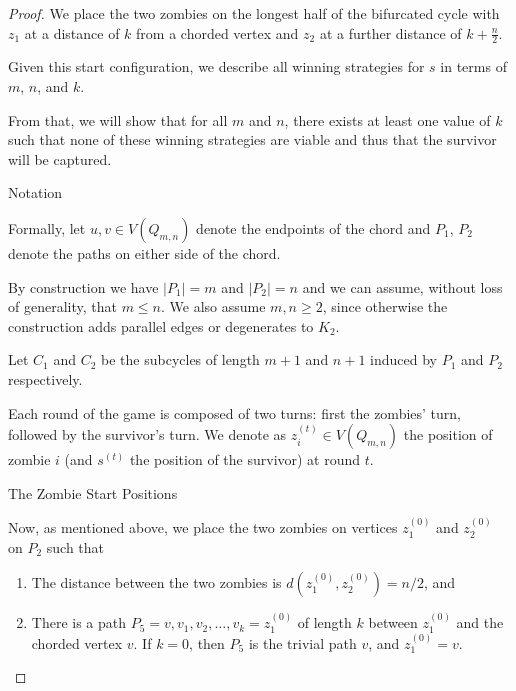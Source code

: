 \documentclass[letterpaper, 10pt]{article}
\begin{document}
\begin{proof}
We place the two zombies on the longest half of the bifurcated cycle with $z_1$ at a distance of $k$
from a chorded vertex and $z_2$ at a further distance of $k + \frac{n}{2}$.

Given this start configuration, we describe all winning strategies for $s$ in terms of
$m$, $n$, and $k$.

From that, we will show that for all $m$ and $n$, there exists at least one value of $k$ such that
none of these winning strategies are viable and thus that the survivor will be captured.

\begin{proofpart} Notation

Formally, let $u,v \in V(Q_{m,n})$ denote the endpoints of the
chord and $P_1$, $P_2$ denote the paths on either side of the chord.

By construction we have $\lvert P_1 \rvert = m$ and $\lvert P_2 \rvert = n$ and we
can assume, without loss of generality, that $m \leq n$. We also assume $m,n \geq 2$, since
otherwise the construction adds parallel edges or degenerates to $K_2$.

Let $C_1$ and $C_2$ be the subcycles of length $m+1$ and $n+1$ induced by
$P_1$ and $P_2$ respectively.

Each round of the game is composed of two turns: first the zombies' turn, followed by the
survivor's turn. We denote as $z_i^{(t)} \in V(Q_{m,n})$ the position of zombie $i$
(and $s^{(t)}$ the position of the survivor) at round $t$.

\end{proofpart}

\begin{proofpart} The Zombie Start Positions

Now, as mentioned above, we place the two zombies on vertices $z_1^{(0)}$ and $z_2^{(0)}$ on $P_2$ such that

\begin{enumerate}
\item The distance between the two zombies is $d(z_1^{(0)}, z_2^{(0)}) = n/2$,  and
\item There is a path $P_5 = v, v_1, v_2, \dots, v_k = z_1^{(0)}$ of length $k$ between $z_1^{(0)}$ and
    the chorded vertex $v$.
    If $k=0$, then $P_5$ is the trivial path $v$, and $z_1^{(0)} = v$.
\end{enumerate}


\end{proofpart}
\end{proof}
\end{document}
